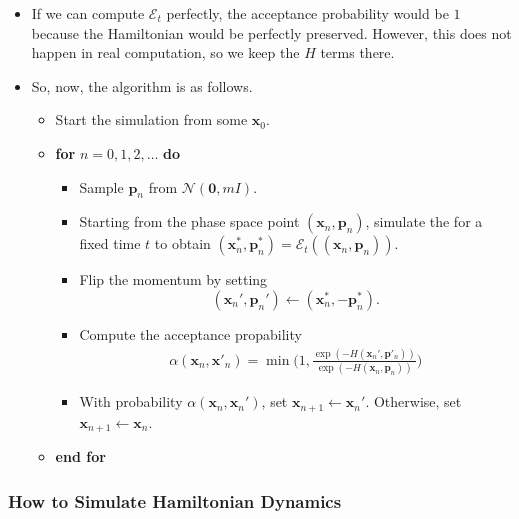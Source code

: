 \documentclass[10pt]{article}
\newcommand{\ve}[1]{\mathbf{#1}}
\newcommand{\mcal}[1]{\mathcal{#1}}
\begin{document}
\begin{itemize}
  \item If we can compute $\mcal{E}_t$ perfectly, the acceptance probability would be $1$ because the Hamiltonian would be perfectly preserved. However, this does not happen in real computation, so we keep the $H$ terms there.

  \item So, now, the algorithm is as follows.
  \begin{itemize}
    \item Start the simulation from some $\ve{x}_0$.
    
    \item {\bf for} $n = 0, 1, 2, \dotsc$ {\bf do}
    
    \begin{itemize}
      \item Sample $\ve{p}_n$ from $\mcal{N}(\ve{0}, mI)$.
      
      \item Starting from the phase space point $(\ve{x}_n, \ve{p}_n)$, simulate the for a fixed time $t$ to obtain $(\ve{x}_n^*, \ve{p}^*_n) = \mcal{E}_t((\ve{x}_n, \ve{p}_n))$.
      
      \item Flip the momentum by setting $$(\ve{x}_n', \ve{p}_n') \gets (\ve{x}_n^*, -\ve{p}_n^*).$$      
      
      \item Compute the acceptance propability 
      \begin{align*} 
        \alpha(\ve{x}_n, \ve{x}'_n) = \min\bigg(1 , \frac{\exp(-H(\ve{x}_n', \ve{p}'_n))}{\exp(-H(\ve{x}_n, \ve{p}_n))} \bigg)
      \end{align*}      
      
      \item With probability $\alpha(\ve{x}_n, \ve{x}_n')$, set $\ve{x}_{n+1} \gets \ve{x}_n'$. Otherwise, set $\ve{x}_{n+1} \gets \ve{x}_n$.
    \end{itemize}

    \item[] {\bf end for}
  \end{itemize}
\end{itemize}

\subsubsection{How to Simulate Hamiltonian Dynamics}
\end{document}
